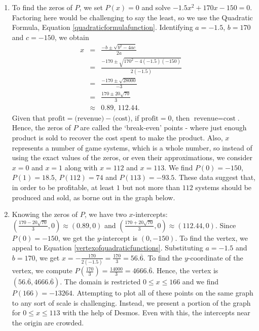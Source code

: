 \documentclass{ximera}
\begin{document}
\begin{example}
\begin{explanation}
\begin{enumerate}
\item  To find the zeros of $P$, we set $P(x) = 0$ and solve  $-1.5x^2+170x-150=0$. Factoring here would be challenging to say the least, so we use the Quadratic Formula,  Equation \ref{quadraticformulafunction}.  Identifying $a = -1.5$, $b=170$ and $c=-150$, we obtain\[ \begin{array}{rclr}

 x & = & \frac{-b \pm \sqrt{b^2-4ac}}{2a} & \\ 
   & = & \frac{-170 \pm \sqrt{170^2 - 4(-1.5)(-150)}}{2(-1.5)} & \\ 
	 & = & \frac{-170 \pm \sqrt{28000}}{-3} & \\ 
	 & = & \frac{170 \pm 20 \sqrt{70}}{3} & \\ 
	 & \approx & 0.89, \, 112.44. \end{array}\] Given that $\text{profit} = \text{(revenue)} - \text{(cost)}$, if $\text{profit} = 0$, then $\text{revenue} = \text{cost}$.  Hence, the zeros of $P$ are called the `break-even' points - where just enough product is sold to recover the cost spent to make the product. Also, $x$ represents a number of game systems, which is a whole number, so instead of using the exact values of the zeros, or even their approximations, we consider $x = 0$ and $x = 1$ along with $x = 112$ and $x=113$. We find $P(0) = -150$, $P(1) = 18.5$, $P(112) = 74$ and $P(113)= -93.5$.  These data suggest that, in order to be profitable, at least $1$ but not more than $112$ systems should be produced and sold, as borne out in the graph below.

\item Knowing the zeros of $P$, we have two $x$-intercepts: $\left( \frac{170 - 20 \sqrt{70}}{3},0\right) \approx (0.89,0)$ and $\left( \frac{170 + 20 \sqrt{70}}{3},0\right) \approx (112.44,0)$.  Since $P(0)=-150$, we get the  $y$-intercept is $(0,-150)$.  To find the vertex, we appeal to Equation \ref{vertexofquadraticfunctions}.  Substituting $a = -1.5$ and $b=170$, we get $x = -\frac{170}{2(-1.5)} = \frac{170}{3} = 56.\overline{6}$.  To find the $y$-coordinate of the vertex, we compute $P\left( \frac{170}{3} \right) = \frac{14000}{3} = 4666.\overline{6}$.  Hence, the vertex is $(56.\overline{6}, 4666.\overline{6})$.  The domain is restricted $0 \leq x \leq 166$ and we find $P(166) = -13264$.  Attempting to plot all of these points on the same graph to any sort of scale is challenging.  Instead, we present a portion of the graph for  $0 \leq x \leq 113$ with the help of Desmos.  Even with this, the intercepts near the origin are crowded.


\end{enumerate}
\end{explanation}
\end{example}
\end{document}
